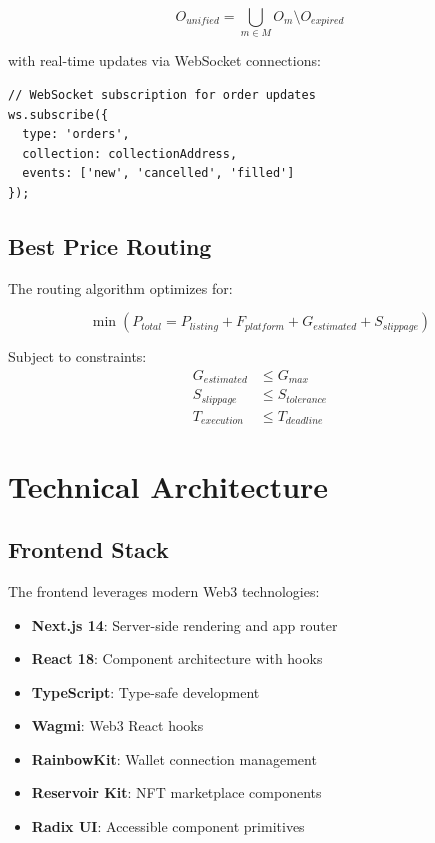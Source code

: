 \documentclass[11pt,a4paper]{article}
\begin{document}
\begin{equation}
O_{unified} = \bigcup_{m \in M} O_m \setminus O_{expired}
\end{equation}

with real-time updates via WebSocket connections:

\begin{lstlisting}[language=Solidity]
// WebSocket subscription for order updates
ws.subscribe({
  type: 'orders',
  collection: collectionAddress,
  events: ['new', 'cancelled', 'filled']
});
\end{lstlisting}

\subsection{Best Price Routing}

The routing algorithm optimizes for:

\begin{equation}
\min \left( P_{total} = P_{listing} + F_{platform} + G_{estimated} + S_{slippage} \right)
\end{equation}

Subject to constraints:
\begin{align}
G_{estimated} &\leq G_{max} \\
S_{slippage} &\leq S_{tolerance} \\
T_{execution} &\leq T_{deadline}
\end{align}

\section{Technical Architecture}

\subsection{Frontend Stack}

The frontend leverages modern Web3 technologies:

\begin{itemize}
\item \textbf{Next.js 14}: Server-side rendering and app router
\item \textbf{React 18}: Component architecture with hooks
\item \textbf{TypeScript}: Type-safe development
\item \textbf{Wagmi}: Web3 React hooks
\item \textbf{RainbowKit}: Wallet connection management
\item \textbf{Reservoir Kit}: NFT marketplace components
\item \textbf{Radix UI}: Accessible component primitives
\end{itemize}
\end{document}
